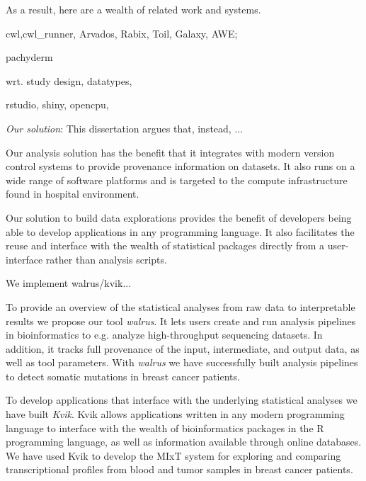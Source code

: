 As a result, here are a wealth of related work and systems. 
\begin{enumerate*}[label=(\roman*)]
    \item cwl,cwl\_runner, Arvados, Rabix, Toil, Galaxy,
        AWE;   
    \item pachyderm
    \item wrt. study design, datatypes, 
    \item rstudio, shiny, opencpu,
\end{enumerate*} 


\emph{Our solution}: 
This dissertation argues that, instead, ... 

Our analysis solution has the benefit that it integrates with modern version
control systems to provide provenance information on datasets. It also runs on a
wide range of software platforms and is targeted to the compute infrastructure
found in hospital environment. 

Our solution to build data explorations provides the benefit of developers being
able to develop applications in any programming language. It also facilitates
the reuse and interface with the wealth of statistical packages directly from a
user-interface rather than analysis scripts. 

We implement walrus/kvik... 

To provide an overview of the statistical analyses from raw data to
interpretable results we propose our tool \emph{walrus}. It lets users create
and run analysis pipelines in bioinformatics to e.g. analyze high-throughput
sequencing datasets. In addition, it tracks full provenance of the input,
intermediate, and output data, as well as tool parameters. With \emph{walrus} we
have successfully built analysis pipelines to detect somatic mutations in breast
cancer patients. 

To develop applications that interface with the underlying statistical analyses
we have built \emph{Kvik}. Kvik allows applications written in any modern
programming language to interface with the wealth of bioinformatics packages in
the R programming language, as well as information available through online
databases. We have used Kvik to develop the MIxT system for exploring and
comparing transcriptional profiles from blood and tumor samples in breast cancer
patients. 


